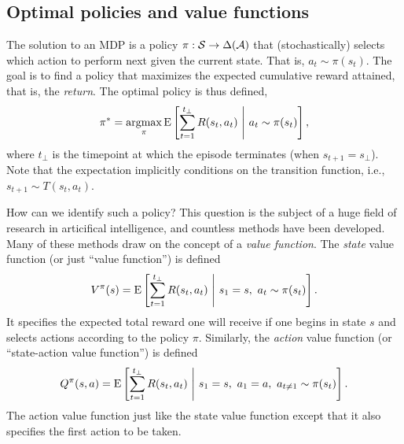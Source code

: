

\subsection{Optimal policies and value functions}

The solution to an MDP is a policy $\pi: \mathcal{S} \rightarrow \Delta(\mathcal{A})$ that (stochastically) selects which action to perform next given the current state. That is, $a_t \sim \pi(s_t)$. The goal is to find a policy that maximizes the expected cumulative reward attained, that is, the \emph{return}. The optimal policy is thus defined,
\begin{equation}\label{eq:optimal-policy}
  \pi^* = \operatorname*{argmax}_\pi \operatorname*{E} \left[ 
    \sum_{t=1}^{t_\bot} R(s_t, a_t)
   \ \middle\vert\ 
   a_t \sim \pi(s_t)
   \right],
\end{equation}
where $t_\bot$ is the timepoint at which the episode terminates (when $s_{t+1} = s_\bot$). Note that the expectation implicitly conditions on the transition function, i.e., $s_{t+1} \sim T(s_t, a_t)$.

How can we identify such a policy? This question is the subject of a huge field of research in articifical intelligence, and countless methods have been developed. Many of these methods draw on the concept of a \emph{value function}. The \emph{state} value function (or just ``value function'') is defined
%
\begin{equation}\label{eq:state-value}
  V^\pi(s) = \operatorname*{E} \left[ 
    \sum_{t=1}^{t_\bot} R(s_t, a_t)
   \ \middle\vert\ 
   s_1 = s,\ a_t \sim \pi(s_t)
   \right].
\end{equation}
%
It specifies the expected total reward one will receive if one begins in state $s$ and selects actions according to the policy $\pi$. Similarly, the \emph{action} value function (or ``state-action value function'') is defined
%
\begin{equation}\label{eq:action-value}
  Q^\pi(s, a) = \operatorname*{E} \left[ 
    \sum_{t=1}^{t_\bot} R(s_t, a_t)
   \ \middle\vert\ 
   s_1 = s,\ a_1 = a,\ a_{t \neq 1} \sim \pi(s_t)
   \right].
\end{equation}
%
The action value function just like the state value function except that it also specifies the first action to be taken. 

